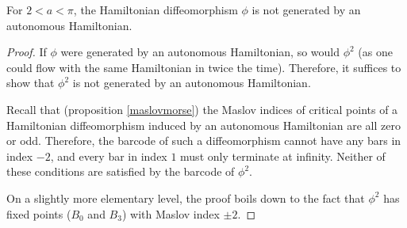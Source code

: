 \begin{corollary}
For $2 < a < \pi$, the Hamiltonian diffeomorphism $\phi$ is not generated by an autonomous Hamiltonian.
\end{corollary}

\begin{proof}
If $\phi$ were generated by an autonomous Hamiltonian, so would $\phi^2$ (as one could flow with the same Hamiltonian in twice the time). Therefore, it suffices to show that $\phi^2$ is not generated by an autonomous Hamiltonian.

Recall that (proposition \ref{maslovmorse}) the Maslov indices of critical points of a Hamiltonian diffeomorphism induced by an autonomous Hamiltonian are all zero or odd. Therefore, the barcode of such a diffeomorphism cannot have any bars in index $-2$, and every bar in index $1$ must only terminate at infinity. Neither of these conditions are satisfied by the barcode of $\phi^2$.

On a slightly more elementary level, the proof boils down to the fact that $\phi^2$ has fixed points ($B_0$ and $B_3$) with Maslov index $\pm 2$.
\end{proof}